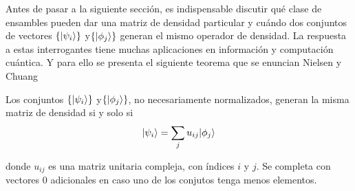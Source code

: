 Antes de pasar a la siguiente sección, es indispensable discutir qué clase de ensambles pueden dar una matriz de densidad particular y cuándo dos conjuntos de vectores $\{|\psi_i\rangle\}$ y$ \{|\phi_j\rangle \}$ generan el mismo operador de densidad. La respuesta a estas interrogantes tiene muchas aplicaciones en información y computación cuántica. Y para ello se presenta el siguiente teorema que se enuncian Nielsen y Chuang {\cite{nielsen_chuang_2010}}




\begin{theorem}
Los conjuntos $\{|\psi_i\rangle\}$ y$ \{|\phi_j\rangle \}$, no necesariamente normalizados, generan la misma matriz de densidad si y solo si
\begin{equation}\label{teorema2.4}
|\psi_i\rangle= \sum_{j}u_{ij}|\phi_j\rangle
\end{equation}

donde $u_{ij}$ es una matriz unitaria compleja, con índices $i$ y $j$. Se completa con vectores 0 adicionales en caso uno de los conjutos tenga menos elementos.
\end{theorem}

